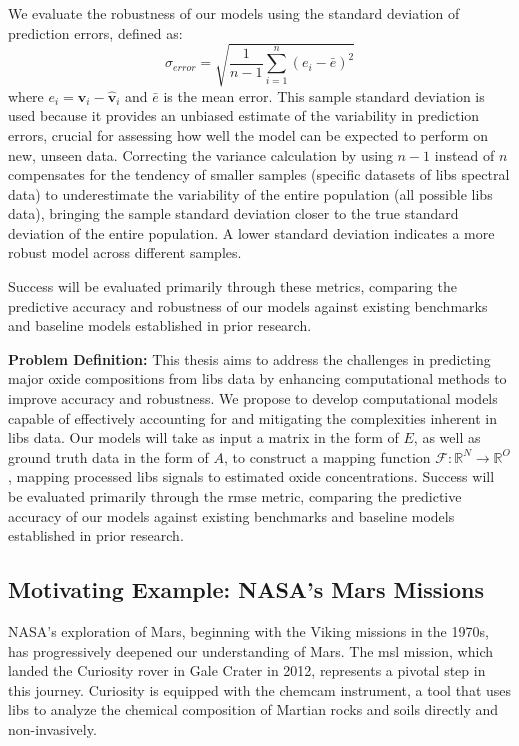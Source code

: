 We evaluate the robustness of our models using the standard deviation of prediction errors, defined as:
\[
\sigma_{error} = \sqrt{\frac{1}{n-1} \sum_{i=1}^{n} (e_i - \bar{e})^2}
\]
where \( e_i = \mathbf{v}_i - \hat{\mathbf{v}}_i \) and \( \bar{e} \) is the mean error.
This sample standard deviation is used because it provides an unbiased estimate of the variability in prediction errors, crucial for assessing how well the model can be expected to perform on new, unseen data.
Correcting the variance calculation by using \( n-1 \) instead of \( n \) compensates for the tendency of smaller samples (specific datasets of \gls{libs} spectral data) to underestimate the variability of the entire population (all possible \gls{libs} data), bringing the sample standard deviation closer to the true standard deviation of the entire population.
A lower standard deviation indicates a more robust model across different samples.

Success will be evaluated primarily through these metrics, comparing the predictive accuracy and robustness of our models against existing benchmarks and baseline models established in prior research.

\textbf{Problem Definition:} This thesis aims to address the challenges in predicting major oxide compositions from \gls{libs} data by enhancing computational methods to improve accuracy and robustness. We propose to develop computational models capable of effectively accounting for and mitigating the complexities inherent in \gls{libs} data. Our models will take as input a matrix in the form of $E$, as well as ground truth data in the form of $A$, to construct a mapping function $\mathcal{F}: \mathbb{R}^N \rightarrow \mathbb{R}^O$, mapping processed \gls{libs} signals to estimated oxide concentrations. Success will be evaluated primarily through the \gls{rmse} metric, comparing the predictive accuracy of our models against existing benchmarks and baseline models established in prior research.

\subsection{Motivating Example: NASA's Mars Missions}
NASA's exploration of Mars, beginning with the Viking missions in the 1970s, has progressively deepened our understanding of Mars\cite{marsnasagov_vikings}. The \gls{msl} mission, which landed the Curiosity rover in Gale Crater in 2012, represents a pivotal step in this journey. Curiosity is equipped with the \gls{chemcam} instrument, a tool that uses \gls{libs} to analyze the chemical composition of Martian rocks and soils directly and non-invasively\cite{chemcamNasaWebsite}.

